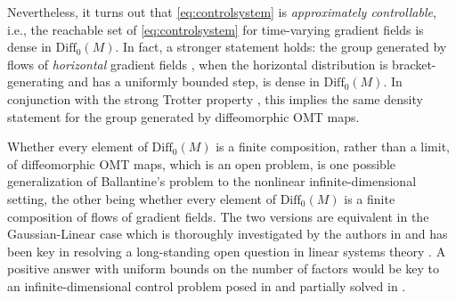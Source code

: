 \documentclass{article}
\theoremstyle{remark}
\newcommand{\M}{M}
\newcommand{\Diff}{\mathrm{Diff}_0(\M)}
\begin{document}
Nevertheless, it turns out that \eqref{eq:controlsystem} is \emph{approximately controllable}, i.e., the reachable set of \eqref{eq:controlsystem} for time-varying gradient fields is dense in $\Diff$. In fact, a stronger statement holds: the group generated by flows of \emph{horizontal} gradient fields \cite{KhesinLee2009}, when the horizontal distribution is bracket-generating and has a uniformly bounded step, is dense in $\Diff$. In conjunction with the strong Trotter property \cite{Glockner2015}, this implies the same density statement for the group generated by diffeomorphic OMT maps.
%

%
Whether every element of $\Diff$ is a finite composition, rather than a limit, of diffeomorphic OMT maps, which is an open problem, is one possible generalization of Ballantine's problem \cite{Ballantine1970} to the nonlinear infinite-dimensional setting, the other being whether every element of $\Diff$ is a finite composition of flows of gradient fields. The two versions are equivalent in the Gaussian-Linear case which is thoroughly investigated by the authors in
\cite{AbdelgalilGeorgiou2024,AbdelgalilGeorgiou2025,AbdelgalilGeorgiou2026} and has been key in resolving a long-standing open question in linear systems theory \cite{AbdelgalilGeorgiou2026TAC}. A positive answer with uniform bounds on the number of factors would be key to an infinite-dimensional control problem posed in \cite{Brockett2007} and partially solved in \cite{AbdelgalilGeorgiou2026TAC}.
\end{document}
